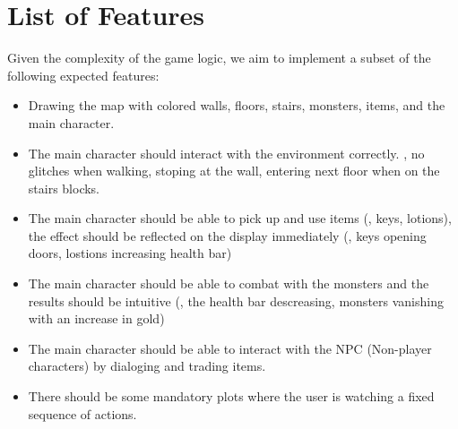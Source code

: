 \documentclass{article}
\begin{document}
\section{List of Features}
Given the complexity of the game logic, we aim to implement a subset of the following expected features:
\begin{itemize}
    \item Drawing the map with colored walls, floors, stairs, monsters, items, and the main character.
    \item The main character should interact with the environment correctly. \Eg, no glitches when walking, stoping at the wall, entering next floor when on the stairs blocks.
    \item The main character should be able to pick up and use items (\eg, keys, lotions), the effect should be reflected on the display immediately (\eg, keys opening doors, lostions increasing health bar)
    \item The main character should be able to combat with the monsters and the results should be intuitive (\eg, the health bar descreasing, monsters vanishing with an increase in gold)
    \item The main character should be able to interact with the NPC (Non-player characters) by dialoging and trading items.
    \item There should be some mandatory plots where the user is watching a fixed sequence of actions.
\end{itemize}
\end{document}
